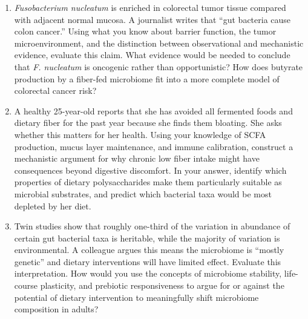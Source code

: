 \documentclass{tufte-handout}
\begin{document}
\begin{enumerate}
\item \textit{Fusobacterium nucleatum} is enriched in colorectal tumor tissue compared with adjacent normal mucosa. A journalist writes that ``gut bacteria cause colon cancer.'' Using what you know about barrier function, the tumor microenvironment, and the distinction between observational and mechanistic evidence, evaluate this claim. What evidence would be needed to conclude that \textit{F. nucleatum} is oncogenic rather than opportunistic? How does butyrate production by a fiber-fed microbiome fit into a more complete model of colorectal cancer risk?

\item A healthy 25-year-old reports that she has avoided all fermented foods and dietary fiber for the past year because she finds them bloating. She asks whether this matters for her health. Using your knowledge of SCFA production, mucus layer maintenance, and immune calibration, construct a mechanistic argument for why chronic low fiber intake might have consequences beyond digestive discomfort. In your answer, identify which properties of dietary polysaccharides make them particularly suitable as microbial substrates, and predict which bacterial taxa would be most depleted by her diet.

\item Twin studies show that roughly one-third of the variation in abundance of certain gut bacterial taxa is heritable, while the majority of variation is environmental. A colleague argues this means the microbiome is ``mostly genetic'' and dietary interventions will have limited effect. Evaluate this interpretation. How would you use the concepts of microbiome stability, life-course plasticity, and prebiotic responsiveness to argue for or against the potential of dietary intervention to meaningfully shift microbiome composition in adults?

\end{enumerate}

\ifx\HCode\undefined
    
    
\fi
\end{document}
